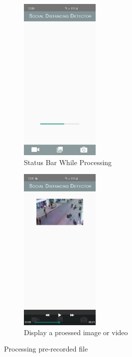     \begin{figure}[h!]
        \centering
        \begin{subfigure}{.5\textwidth}
        \centering
        \includegraphics[width=1.5in]{images/appendix-b/sh-processing.jpg}
        \caption{Status Bar While Processing}
        \label{appendix-b:statusBar}
        \end{subfigure}%
        \begin{subfigure}{.5\textwidth}
        \centering
        \includegraphics[width=1.5in]{images/appendix-b/sh-output.jpg}
        \caption{Display a proessed image or video}
        \label{appendix-b:result}
        \end{subfigure}
        \caption{Processing pre-recorded file}
        \label{appendix-b:process}
    \end{figure}

